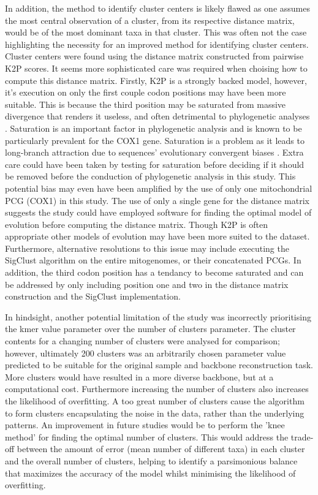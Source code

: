 \documentclass[12pt]{article}
\begin{document}
  In addition, the method to identify cluster centers is likely flawed as one assumes the most central observation of a cluster, from its respective distance matrix, would be of the most dominant taxa in that cluster. This was often not the case highlighting the necessity for an improved method for identifying cluster centers. Cluster centers were found using the distance matrix constructed from pairwise K2P scores. It seems more sophisticated care was required when choising how to compute this distance matrix. Firstly, K2P is a strongly backed model, however, it's execution on only the first couple codon positions may have been more suitable. This is because the third position may be saturated from massive divergence that renders it useless, and often detrimental to phylogenetic analyses \cite{orlov}. Saturation is an important factor in phylogenetic analysis and is known to be particularly prevalent for the COX1 gene. Saturation is a problem as it leads to long-branch attraction due to sequences' evolutionary convergent biases \cite{Yuan2022}. Extra care could have been taken by testing for saturation \cite{YUAN201699} before deciding if it should be removed before the conduction of phylogenetic analysis in this study. This potential bias may even have been amplified by the use of only one mitochondrial PCG (COX1) in this study. The use of only a single gene for the distance matrix suggests the study could have employed software for finding the optimal model of evolution \cite{} before computing the distance matrix. Though K2P is often appropriate other models of evolution may have been more suited to the dataset. Furthermore, alternative resolutions to this issue may include executing the SigClust algorithm on the entire mitogenomes, or their concatenated PCGs. In addition, the third codon position has a tendancy to become saturated and can be addressed by only including position one and two in the distance matrix construction and the SigClust implementation.

  In hindsight, another potential limitation of the study was incorrectly prioritising the kmer value parameter over the number of clusters parameter. The cluster contents for a changing number of clusters were analysed for comparison; however, ultimately 200 clusters was an arbitrarily chosen parameter value predicted to be suitable for the original sample and backbone reconstruction task. More clusters would have resulted in a more diverse backbone, but at a computational cost. Furthermore increasing the number of clusters also increases the likelihood of overfitting. A too great number of clusters cause the algorithm to form clusters encapsulating the noise in the data, rather than the underlying patterns. An improvement in future studies would be to perform the 'knee method' for finding the optimal number of clusters. This would address the trade-off between the amount of error (mean number of different taxa) in each cluster and the overall number of clusters, helping to identify a parsimonious balance that maximizes the accuracy of the model whilst minimising the likelihood of overfitting. 
\end{document}
